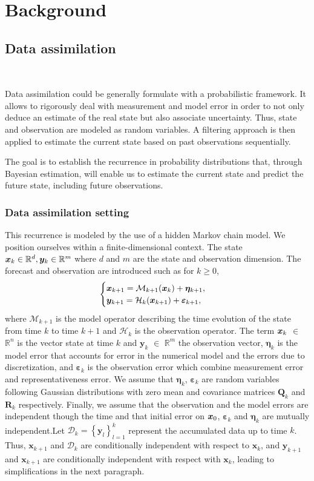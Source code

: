 
\section{Background}

\subsection{Data assimilation}~\label{Background_DA}

Data assimilation could be generally formulate with a probabilistic framework. It allows to rigorously deal with measurement and model error in order to not only deduce an estimate of the real state but also associate uncertainty. Thus, state and observation are modeled as random variables. A filtering approach is then applied to estimate the current state based on past observations sequentially.

The goal is to establish the recurrence in probability distributions that, through Bayesian estimation, will enable us to estimate the current state and predict the future state, including future observations.


\subsubsection{Data assimilation setting}

This recurrence is modeled by the use of a hidden Markov chain model. We position ourselves within a finite-dimensional context. The state $\bm x_k \in \mathbb{R}^d, \bm y_k \in \mathbb{R}^m$ where $d$ and $m$ are the state and observation dimension. The forecast and observation are introduced such as for $ k \geq 0$,
\[
    \begin{cases}
        \bm{x}_{k+1} = \mathcal{M}_{k+1} (\bm{x}_{k}) + \bm{\eta}_{k+1}, \\
        \bm{y}_{k+1} = \mathcal{H}_k (\bm{x}_{k+1}) + \bm \varepsilon_{k+1},
    \end{cases}
\]where $\mathcal{M}_{k+1}$ is the model operator describing the time evolution of the state from time $k$ to time $k+1$ and $\mathcal{H}_k$ is the observation operator. The term $\bm{x}_k$ $\in$ $\mathbb{R}^n$ is the vector state at time $k$ and $\bm{y}_k$ $\in$ $\mathbb{R}^m$ the observation vector, $\bm{\eta}_{k}$ is the model error that accounts for error in the numerical model and the errors due to discretization, and $\bm{\varepsilon}_k$ is the observation error which combine measurement error and representativeness error. We assume that $\bm{\eta}_{k}$, $\bm{\varepsilon}_k$ are random variables following Gaussian distributions with zero mean and covariance matrices $\bm Q_k$ and $\bm R_k$ respectively. Finally, we assume that the observation and the model errors are independent though the time and that initial error on $\bm{x}_0$, $\bm{\varepsilon}_k$ and $\bm{\eta}_{k}$ are mutually independent.Let $\mathcal{D}_k = \left\{\bm y_l\right\}_{l=1}^k$ represent the accumulated data up to time $k$.
Thus, $\bm x_{k+1}$ and $\mathcal{D}_k$ are conditionally independent with respect to $\bm x_{k}$, and $\bm{y}_{k+1}$ and $\bm x_{k+1}$ are conditionally independent with respect with $\bm x_{k}$, leading to simplifications in the next paragraph.

